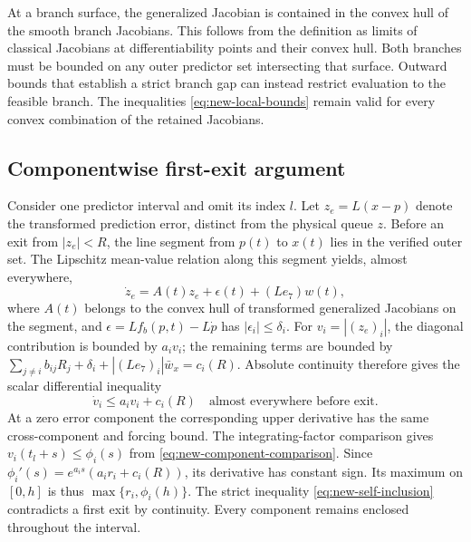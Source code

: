 At a branch surface, the generalized Jacobian is contained in the convex hull
of the smooth branch Jacobians. This follows from the definition as limits
of classical Jacobians at differentiability points and their convex hull.
Both branches must be bounded on any outer predictor set intersecting that
surface. Outward bounds that establish a strict branch gap can instead
restrict evaluation to the feasible branch. The inequalities
\eqref{eq:new-local-bounds} remain valid for every convex combination of the
retained Jacobians.

\subsection{Componentwise first-exit argument}

Consider one predictor interval and omit its index $l$. Let
$z_e=L(x-p)$ denote the transformed prediction error, distinct from the
physical queue $z$. Before an exit from $|z_e|<R$, the line segment from
$p(t)$ to $x(t)$ lies in the verified outer set. The Lipschitz mean-value
relation along this segment yields, almost everywhere,
\begin{equation}
 \dot z_e=A(t)z_e+\epsilon(t)+(Le_7)w(t),
 \label{eq:new-error-dynamics}
\end{equation}
where $A(t)$ belongs to the convex hull of transformed generalized Jacobians
on the segment, and
$\epsilon=L f_b(p,t)-L\dot p$ has $|\epsilon_i|\le\delta_i$.
For $v_i=|(z_e)_i|$, the diagonal contribution is bounded by $a_iv_i$;
the remaining terms are bounded by
$\sum_{j\ne i}b_{ij}R_j+\delta_i+|(Le_7)_i|\bar w_x=c_i(R)$.
Absolute continuity therefore gives the scalar differential inequality
\begin{equation}
 \dot v_i\le a_iv_i+c_i(R)
 \quad\text{almost everywhere before exit}.
 \label{eq:new-error-comparison-proof}
\end{equation}
At a zero error component the corresponding upper derivative has the same
cross-component and forcing bound. The integrating-factor comparison gives
$v_i(t_l+s)\le\phi_i(s)$ from
\eqref{eq:new-component-comparison}. Since
$\phi_i'(s)=e^{a_is}(a_ir_i+c_i(R))$, its derivative has constant sign.
Its maximum on $[0,h]$ is thus $\max\{r_i,\phi_i(h)\}$.
The strict inequality \eqref{eq:new-self-inclusion} contradicts a first
exit by continuity. Every component remains enclosed throughout the interval.

